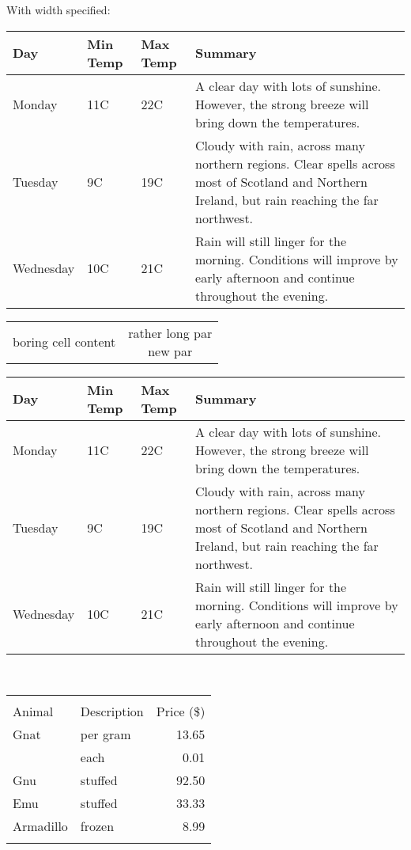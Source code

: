 \documentclass[11pt]{article}
\begin{document}
With width specified:
\begin{center}
    \begin{tabular}{ | l | l | l | p{5cm} |}
    \hline
    Day & Min Temp & Max Temp & Summary \\ \hline
    Monday & 11C & 22C & A clear day with lots of sunshine.  
    However, the strong breeze will bring down the temperatures. \\ \hline
    Tuesday & 9C & 19C & Cloudy with rain, across many northern regions. Clear spells 
    across most of Scotland and Northern Ireland, 
    but rain reaching the far northwest. \\ \hline
    Wednesday & 10C & 21C & Rain will still linger for the morning. 
    Conditions will improve by early afternoon and continue 
    throughout the evening. \\
    \hline
    \end{tabular}
\end{center}


\begin{tabular}{cc}
  boring cell content & \parbox[t]{5cm}{rather long par\\new par}
\end{tabular}





\begin{center}
   \begin{tabular}{| l | l | l | l |}
   \hline
   Day & Min Temp & Max Temp & Summary \\ \hline
   Monday & 11C & 22C & A clear day with lots of sunshine.
   However, the strong breeze will bring down the temperatures. \\ \hline
   Tuesday & 9C & 19C & Cloudy with rain, across many northern regions. Clear spells 
   across most of Scotland and Northern Ireland, 
   but rain reaching the far northwest. \\ \hline
   Wednesday & 10C & 21C & Rain will still linger for the morning. 
   Conditions will improve by early afternoon and continue 
   throughout the evening. \\
   \hline
   \end{tabular}\\[6pt]
\end{center}




\begin{tabular}{ | l | l | r | }
  \hline\noalign{\smallskip}
  \multicolumn{2}{c}{Item} \\
  \cline{1-2}\noalign{\smallskip}
  Animal & Description & Price (\$) \\
  \noalign{\smallskip}\hline\noalign{\smallskip}
  Gnat  & per gram & 13.65 \\
        & each     &  0.01 \\
  Gnu   & stuffed  & 92.50 \\
  Emu   & stuffed  & 33.33 \\
  Armadillo & frozen & 8.99 \\
  \noalign{\smallskip}\hline
\end{tabular}
\end{document}
